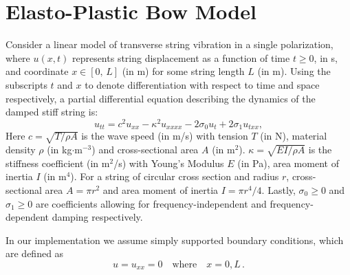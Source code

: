\documentclass[twoside,a4paper,dvipsnames]{article}
\def\SWcomment[#1]{\textcolor{Green}{}}
\begin{document}
\section{Elasto-Plastic Bow Model}\label{sec:elasto}

Consider a linear model of transverse string vibration in a single polarization, where $u(x,t)$ represents string displacement as a function of time $t\geq 0$, in s, and coordinate $x\in[0,\,L]$ (in m) for some string length $L$ (in m). Using the subscripts $t$ and $x$ to denote differentiation with respect to time and space respectively, a partial differential equation describing the dynamics of the damped stiff string is: \cite{Bilbao2009}
\begin{equation}\label{eq:PDE}
    u_{tt} = c^2u_{xx}-\kappa^2u_{xxxx}-2\sigma_0u_t+2\sigma_1u_{txx},
\end{equation}
Here $c = \sqrt{T/\rho A}$ is the wave speed (in m/s) with tension $T$ (in N), material density $\rho$ (in kg$\cdot$m$^{-3}$) and cross-sectional area $A$ (in m$^2$). $\kappa = \sqrt{EI/\rho A}$ is the stiffness coefficient (in m$^2$/s) with Young's Modulus $E$ (in Pa), area moment of inertia $I$ (in m$^4$). For a string of circular cross section and radius $r$, cross-sectional area $A=\pi r^2$ and area moment of inertia $I=\pi r^4 /4$.  Lastly, $\sigma_0 \geq 0$ and $\sigma_1 \geq 0$ are coefficients allowing for frequency-independent and frequency-dependent damping respectively. 

In our implementation we assume simply supported boundary conditions, which are defined as
\begin{equation}
    u = u_{xx} = 0 \quad \text{where} \quad x = 0, L\, .
\end{equation}
\end{document}
